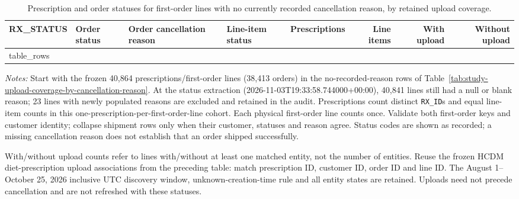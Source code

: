 \begin{table}[htbp]
\centering
\caption{Prescription and order statuses for first-order lines with no currently recorded cancellation reason, by retained upload coverage.}
\label{tab:study-no-cancellation-upload-details}
\small
\setlength{\tabcolsep}{6pt}
\begin{tabular}{llllrrrr}
\toprule
RX\_STATUS & Order status & Order cancellation reason & Line-item status & Prescriptions & Line items & With upload & Without upload \\
\midrule
{{ table_rows }}
\bottomrule
\end{tabular}
\begin{minipage}{\linewidth}
\footnotesize
\textit{Notes:} Start with the frozen 40,864 prescriptions/first-order lines
(38,413 orders) in the no-recorded-reason rows of
Table~\ref{tab:study-upload-coverage-by-cancellation-reason}.
At the status extraction (2026-11-03T19:33:58.744000+00:00),
40,841 lines still had a null or blank reason;
23 lines with newly populated reasons are excluded and retained in the audit.
Prescriptions count distinct \texttt{RX\_ID}s and equal line-item counts in this
one-prescription-per-first-order-line cohort. Each physical first-order line
counts once. Validate both first-order keys and
customer identity; collapse shipment rows only when their customer, statuses and
reason agree. Status codes are shown as recorded; a missing cancellation reason
does not establish that an order shipped successfully.

With/without upload counts refer to lines with/without at least one matched
entity, not the number of entities. Reuse the frozen HCDM diet-prescription
upload associations from the preceding table: match prescription ID, customer ID,
order ID and line ID. The August 1--October 25, 2026 inclusive UTC discovery window,
unknown-creation-time rule and all entity states are retained. Uploads need not
precede cancellation and are not refreshed with these statuses.
\end{minipage}
\end{table}
